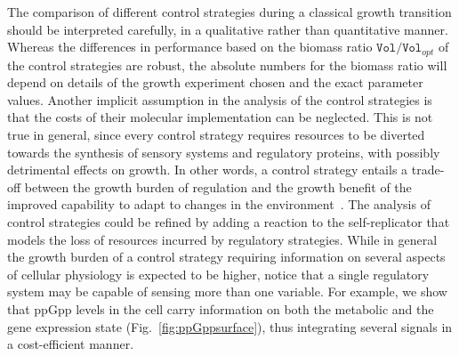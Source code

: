 The comparison of different control strategies during a classical growth transition should be interpreted carefully, in a qualitative rather than quantitative manner. 
Whereas the differences in performance based on the biomass ratio $\texttt{Vol} / \texttt{Vol}_{opt}$ of the control strategies are robust, the absolute numbers for the biomass ratio will depend on details of the growth experiment chosen and the exact parameter values. 
Another implicit assumption in the analysis of the control strategies is that the costs of their molecular implementation can be neglected.
This is not true in general, since every control strategy requires resources to be diverted towards the synthesis of sensory systems and regulatory proteins, with possibly detrimental effects on growth.
In other words, a control strategy entails a trade-off between the growth burden of regulation and the growth benefit of the improved capability to adapt to changes in the environment~\cite{kalisky_costbenefit_2007,poelwijk_tradeoffs_2011}. 
The analysis of control strategies could be refined by adding a reaction to the self-replicator that models the loss of resources incurred by regulatory strategies.
While in general the growth burden of a control strategy requiring information on several aspects of cellular physiology is expected to be higher, notice that a single regulatory system may be capable of sensing more than one variable.
For example, we show that ppGpp levels in the cell carry information on both the metabolic and the gene expression state (Fig.~\ref{fig:ppGppsurface}), thus integrating several signals in a cost-efficient manner. 

